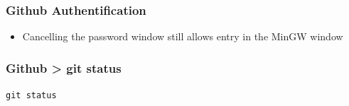 \documentclass[12pt,english]{beamer}
\begin{document}
\begin{frame}
\frametitle{Github Authentification}

\begin{itemize}
	\item Cancelling the password window still allows entry in the MinGW window
\end{itemize}


\end{frame}

\begin{frame}
\frametitle{Github > git status}

\texttt{git status}


\end{frame}
\end{document}

